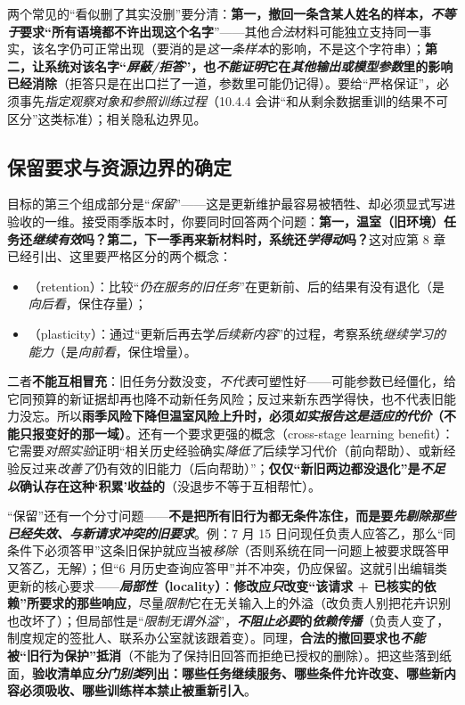 两个常见的“看似删了其实没删”要分清：\textbf{第一，撤回一条含某人姓名的样本，\emph{不等于}要求“所有语境都不许出现这个名字}”——其他\emph{合法}材料可能独立支持同一事实，该名字仍可正常出现（要消的是\emph{这一条样本}的影响，不是这个字符串）；\textbf{第二，让系统对该名字“\emph{屏蔽/拒答}”，也\emph{不能证明}它在\emph{其他输出或模型参数}里的影响已经消除}（拒答只是在出口拦了一道，参数里可能仍记得）。要给“严格保证”，必须事先\emph{指定观察对象和参照训练过程}（10.4.4 会讲“和从剩余数据重训的结果不可区分”这类标准）；相关隐私边界见。

\subsection{保留要求与资源边界的确定}
\label{sec:ket-update-requirements}

目标的第三个组成部分是“\emph{保留}”——这是更新维护最容易被牺牲、却必须显式写进验收的一维。接受雨季版本时，你要同时回答两个问题：\textbf{第一，温室（旧环境）任务还\emph{继续有效}吗？第二，下一季再来新材料时，系统还\emph{学得动}吗？}这对应第 8 章已经引出、这里要严格区分的两个概念：
\begin{itemize}\item {}（retention）：比较“\emph{仍在服务的旧任务}”在更新前、后的结果有没有退化（是\emph{向后看}，保住存量）；\item {}（plasticity）：通过“更新后再去学\emph{后续新内容}”的过程，考察系统\emph{继续学习的能力}（是\emph{向前看}，保住增量）。\end{itemize}
二者\textbf{不能互相冒充}：旧任务分数没变，\emph{不代表}可塑性好——可能参数已经僵化，给它同预算的新证据却再也降不动新任务风险；反过来新东西学得快，也不代表旧能力没忘。所以\textbf{雨季风险下降但温室风险上升时，必须\emph{如实报告这是适应的\emph{代价}}（不能只报变好的那一域）}。还有一个要求更强的概念（cross-stage learning benefit）：它需要\emph{对照实验}证明“相关历史经验确实\emph{降低了}后续学习代价（前向帮助）、或新经验反过来\emph{改善了}仍有效的旧能力（后向帮助）”；\textbf{仅仅“新旧两边都没退化”是\emph{不足以}确认存在这种‘积累’收益的}（没退步不等于互相帮忙）。

“保留”还有一个分寸问题——\textbf{不是把所有旧行为都无条件冻住，而是要\emph{先剔除那些\emph{已经失效、与新请求冲突}的旧要求}}。例：7 月 15 日问现任负责人应答乙，那么“同条件下必须答甲”这条旧保护就应当被\emph{移除}（否则系统在同一问题上被要求既答甲又答乙，无解）；但“6 月历史查询应答甲”并不冲突，仍应保留。这就引出编辑类更新的核心要求——\textbf{\emph{局部性}（locality）}：\textbf{修改应\emph{只}改变“该请求 + 已核实的依赖”所要求的那些响应}，尽量\emph{限制}它在无关输入上的外溢（改负责人别把花卉识别也改坏了）；但局部性是“\emph{限制\emph{无谓}外溢}”，\textbf{\emph{不阻止}\emph{必要}的\emph{依赖传播}}（负责人变了，制度规定的签批人、联系办公室就该跟着变）。同理，\textbf{合法的撤回要求也\emph{不能}被“旧行为保护”抵消}（不能为了保持旧回答而拒绝已授权的删除）。把这些落到纸面，\textbf{验收清单应\emph{分门别类}列出：哪些任务继续服务、哪些条件允许改变、哪些新内容必须吸收、哪些训练样本禁止被重新引入}。

